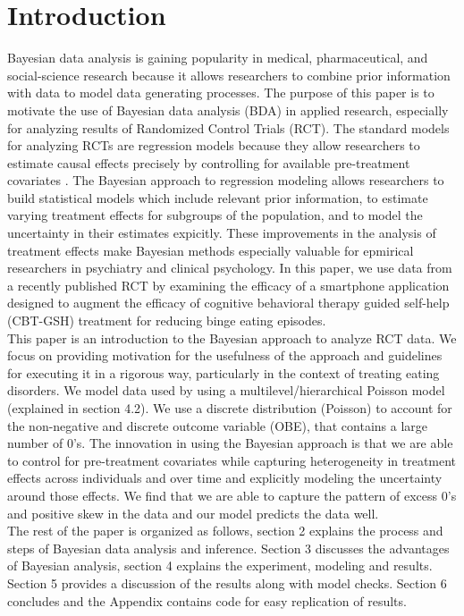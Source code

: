 \documentclass{article}
\begin{document}
\section{Introduction}
Bayesian data analysis is gaining popularity in medical, pharmaceutical, and social-science research because it allows researchers to combine prior information with data to model data generating processes. The purpose of this paper is to motivate the use of Bayesian data analysis (BDA) in applied research, especially for analyzing results of Randomized Control Trials (RCT). The standard models for analyzing RCTs are regression models because they allow researchers to estimate causal effects precisely by controlling for available pre-treatment covariates \cite{gelman2006data}. The Bayesian approach to regression modeling allows researchers to build statistical models which include relevant prior information, to estimate varying treatment effects for subgroups of the population, and to model the uncertainty in their estimates expicitly.  These improvements in the analysis of treatment effects make Bayesian methods especially valuable for epmirical researchers in psychiatry and clinical psychology.   In this paper, we use data from a recently published RCT by  examining the efficacy of a smartphone application designed to augment the efficacy of cognitive behavioral therapy guided self-help (CBT-GSH) treatment for reducing binge eating episodes. \\
This paper is an introduction to the Bayesian approach to analyze RCT data. We focus on providing motivation for the usefulness of the approach and guidelines for executing it in a rigorous way, particularly in the context of treating eating disorders. We model data used by  using a multilevel/hierarchical Poisson model (explained in section 4.2). We use a discrete distribution (Poisson) to account for the non-negative and discrete outcome variable (OBE), that contains a large number of 0's. The innovation in using the Bayesian approach is that we are able to control for pre-treatment covariates while capturing heterogeneity in treatment effects across individuals and over time and explicitly modeling the uncertainty around those effects.  We find that we are able to capture the pattern of excess 0's and positive skew in the data and our model predicts the data well. \\
The rest of the paper is organized as follows, section 2 explains the process and steps of Bayesian data analysis and inference. Section 3 discusses the advantages of Bayesian analysis, section 4 explains the experiment, modeling and results. Section 5 provides a discussion of the results along with model checks. Section 6 concludes and the Appendix contains code for easy replication of results.
\end{document}
